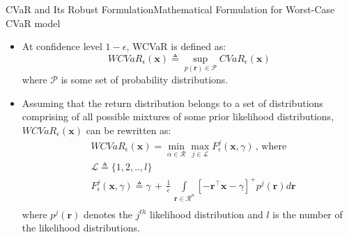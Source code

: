 \documentclass{beamer}
\begin{document}
\begin{frame}{CVaR and Its Robust Formulation}{Mathematical Formulation for Worst-Case CVaR model}
\begin{itemize}
    \item{At confidence level $1-\epsilon$, WCVaR is defined as:
\begin{equation}
\label{eq:6.2}
WCVaR_{\epsilon}(\mathbf{x}) \triangleq \sup_{p(\mathbf{r}) \in \mathcal{P}}CVaR_{\epsilon}(\mathbf{x})
\end{equation}
where $\mathcal{P}$ is some set of probability distributions.}
\item{Assuming that the return distribution belongs to a set of distributions comprising of all possible mixtures of some prior likelihood distributions, $WCVaR_{\epsilon}(\mathbf{x})$ can be rewritten as:
\begin{equation}
\label{eq:6.9}
\begin{split}
& WCVaR_{\epsilon}(\mathbf{x}) = \min_{\alpha \in \mathcal{R}} \max_{j \in \mathcal{L} } F_{\epsilon}^{j}(\mathbf{x},\gamma) \, , \, \text{where} \\
& \mathcal{L} \triangleq \{ 1,2,..,l \} \\
& F_{\epsilon}^{j}(\mathbf{x},\gamma) \triangleq \gamma \, + \, \frac{1}{\epsilon} \, \int \limits_{\mathbf{r} \in \mathcal{R}^{n}} [-\mathbf{r}^{\top}\mathbf{x}-\gamma]^{+} p^{j}(\mathbf{r})  d\mathbf{r} \\
\end{split}
\end{equation}
where $p^{j}(\mathbf{r})$ denotes the $j^{th}$ likelihood distribution and $l$ is the number of the likelihood distributions.}
\end{itemize}

\end{frame}
\end{document}

